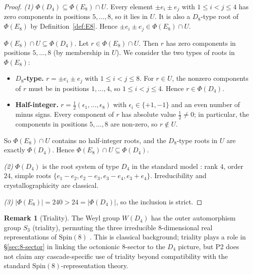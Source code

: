 \documentclass[11pt, a4paper]{amsart}
\theoremstyle{definition}
\newtheorem{remark}[theorem]{Remark}
\newcommand{\Spin}{\mathrm{Spin}}
\begin{document}
\begin{proof}
\emph{(1) $\Phi(D_4) \subseteq \Phi(E_8) \cap U$.} Every element
$\pm e_i \pm e_j$ with $1 \leq i < j \leq 4$ has zero components in
positions $5, \ldots, 8$, so it lies in $U$. It is also a
$D_8$-type root of $\Phi(E_8)$ by Definition~\ref{def:E8}. Hence
$\pm e_i \pm e_j \in \Phi(E_8) \cap U$.

\emph{$\Phi(E_8) \cap U \subseteq \Phi(D_4)$.} Let $r \in \Phi(E_8)
\cap U$. Then $r$ has zero components in positions $5, \ldots, 8$
(by membership in $U$). We consider the two types of roots in
$\Phi(E_8)$:
\begin{itemize}
\item \textbf{$D_8$-type.} $r = \pm e_i \pm e_j$ with $1 \leq i <
  j \leq 8$. For $r \in U$, the nonzero components of $r$ must be
  in positions $1, \ldots, 4$, so $1 \leq i < j \leq 4$. Hence
  $r \in \Phi(D_4)$.
\item \textbf{Half-integer.} $r = \frac{1}{2}(\epsilon_1, \ldots,
  \epsilon_8)$ with $\epsilon_i \in \{+1, -1\}$ and an even number
  of minus signs. Every component of $r$ has absolute value
  $\frac{1}{2} \neq 0$; in particular, the components in positions
  $5, \ldots, 8$ are non-zero, so $r \notin U$.
\end{itemize}
So $\Phi(E_8) \cap U$ contains no half-integer roots, and the
$D_8$-type roots in $U$ are exactly $\Phi(D_4)$. Hence
$\Phi(E_8) \cap U \subseteq \Phi(D_4)$.

\emph{(2)} $\Phi(D_4)$ is the root system of type $D_4$ in the
standard model \cite[\S 12.1]{Humphreys}: rank $4$, order $24$,
simple roots $\{e_1 - e_2, e_2 - e_3, e_3 - e_4, e_3 + e_4\}$.
Irreducibility and crystallographicity are classical.

\emph{(3)} $|\Phi(E_8)| = 240 > 24 = |\Phi(D_4)|$, so the
inclusion is strict.
\end{proof}

\begin{remark}[Triality]
\label{rmk:triality}
The Weyl group $W(D_4)$ has the outer automorphism group $S_3$
(triality), permuting the three irreducible $8$-dimensional real
representations of $\Spin(8)$ \cite[\S 20.3]{FultonHarris}. This is
classical background; triality plays a role in \S\ref{sec:8-sector}
in linking the octonionic $8$-sector to the $D_4$ picture, but P2
does not claim any cascade-specific use of triality beyond
compatibility with the standard $\Spin(8)$-representation theory.
\end{remark}
\end{document}

